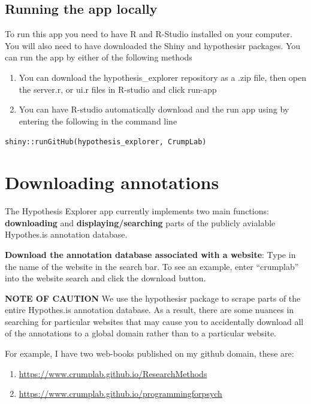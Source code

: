 \documentclass[]{book}
\providecommand{\tightlist}{%
  \setlength{\itemsep}{0pt}\setlength{\parskip}{0pt}}
\begin{document}
\subsection{Running the app locally}\label{running-the-app-locally}

To run this app you need to have R and R-Studio installed on your
computer. You will also need to have downloaded the Shiny and
hypothesisr packages. You can run the app by either of the following
methods

\begin{enumerate}
\def\labelenumi{\arabic{enumi}.}
\item
  You can download the hypothesis\_explorer repository as a .zip file,
  then open the server.r, or ui.r files in R-studio and click run-app
\item
  You can have R-studio automatically download and the run app using by
  entering the following in the command line
\end{enumerate}

\texttt{shiny::runGitHub(\textquotesingle{}hypothesis\_explorer\textquotesingle{},\ \textquotesingle{}CrumpLab\textquotesingle{})}

\section{Downloading annotations}\label{downloading-annotations}

The Hypothesis Explorer app currently implements two main functions:
\textbf{downloading} and \textbf{displaying/searching} parts of the
publicly avialable Hypothes.is annotation database.

\textbf{Download the annotation database associated with a website}:
Type in the name of the website in the search bar. To see an example,
enter ``crumplab'' into the website search and click the download
button.

\textbf{NOTE OF CAUTION} We use the hypothesisr package to scrape parts
of the entire Hypothes.is annotation database. As a result, there are
some nuances in searching for particular websites that may cause you to
accidentally download all of the annotations to a global domain rather
than to a particular website.

For example, I have two web-books published on my github domain, these
are:

\begin{enumerate}
\def\labelenumi{\arabic{enumi}.}
\tightlist
\item
  \url{https://www.crumplab.github.io/ResearchMethods}
\item
  \url{https://www.crumplab.github.io/programmingforpsych}
\end{enumerate}
\end{document}
